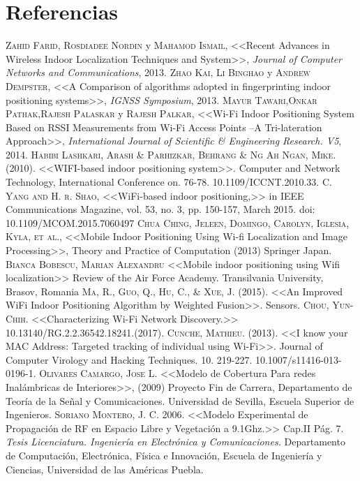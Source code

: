 \chapter{Referencias}

\begin{thebibliography}{X}
 \textsc{Zahid Farid, Rosdiadee Nordin} y \textsc{Mahamod Ismail}, <<Recent Advances in Wireless Indoor Localization Techniques and System>>, \textit{Journal of Computer Networks and Communications}, 2013.
 \textsc{Zhao Kai, Li Binghao} y \textsc{Andrew Dempster}, <<A Comparison of algorithms adopted in fingerprinting indoor positioning systems>>, \textit{IGNSS Symposium}, 2013.
 \textsc{Mayur Tawari},\textsc{Onkar Pathak},\textsc{Rajesh Palaskar} y \textsc{Rajesh Palkar}, <<Wi-Fi Indoor Positioning System Based on RSSI Measurements from Wi-Fi Access Points –A Tri-lateration Approach>>, \textit{International Journal of Scientific \& Engineering Research. V5}, 2014.
 \textsc{Habibi Lashkari, Arash \& Parhizkar, Behrang \& Ng Ah Ngan, Mike.} (2010). <<WIFI-based indoor positioning system>>. Computer and Network Technology, International Conference on. 76-78. 10.1109/ICCNT.2010.33. 
 \textsc{C. Yang and H. r. Shao}, <<WiFi-based indoor positioning,>> in IEEE Communications Magazine, vol. 53, no. 3, pp. 150-157, March 2015. doi: 10.1109/MCOM.2015.7060497
 \textsc{Chua Ching, Jeleen, Domingo, Carolyn, Iglesia, Kyla, et al.}, <<Mobile Indoor Positioning Using Wi-fi Localization and Image Processing>>, Theory and Practice of Computation (2013) Springer Japan.
 \textsc{Bianca Bobescu, Marian Alexandru} <<Mobile indoor positioning using Wifi localization>> Review of the Air Force Academy. Transilvania University, Brasov, Romania
 \textsc{Ma, R., Guo, Q., Hu, C., \& Xue, J.} (2015). <<An Improved WiFi Indoor Positioning Algorithm by Weighted Fusion>>. Sensors.
 \textsc{Chou, Yun-Chih.} <<Characterizing Wi-Fi Network Discovery.>> 10.13140/RG.2.2.36542.18241.(2017).
 \textsc{Cunche, Mathieu.} (2013). <<I know your MAC Address: Targeted tracking of individual using Wi-Fi>>. Journal of Computer Virology and Hacking Techniques. 10. 219-227. 10.1007/s11416-013-0196-1. 
\textsc{Olivares Camargo, Jose L.} <<Modelo de Cobertura Para redes Inalámbricas de Interiores>>, (2009) Proyecto Fin de Carrera, Departamento de Teoría de la Señal y Comunicaciones. Universidad de Sevilla, Escuela Superior de Ingenieros.\label{pdf:1}
 \textsc{Soriano Montero, J. C.} 2006. <<Modelo Experimental de Propagación de RF en Espacio Libre y Vegetación a 9.1Ghz.>> Cap.II Pág. 7.
\textit{Tesis Licenciatura. Ingeniería en Electrónica y Comunicaciones.} Departamento de Computación, Electrónica, Física e Innovación, Escuela de Ingeniería y Ciencias, Universidad de las Américas Puebla. \label{pdf:modprop}


\end{thebibliography}
